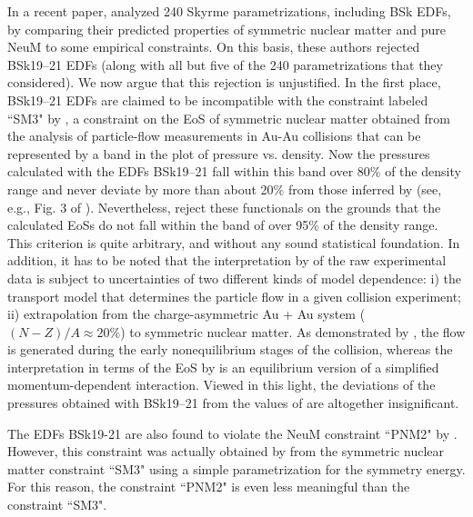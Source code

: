 \documentclass{aa}
\begin{document}
In a recent paper, \citet{dutra2012} analyzed 
240 Skyrme parametrizations, including
BSk EDFs, by comparing their predicted 
properties of symmetric nuclear matter and pure NeuM to some 
empirical constraints. On this basis, these authors rejected
BSk19--21 EDFs
(along with all but five of the 240 parametrizations that they considered). We
now argue that this rejection is unjustified. In the first 
place, BSk19--21 EDFs are claimed to be incompatible with the constraint
labeled ``SM3" by \citet{dutra2012}, a constraint on the EoS of symmetric nuclear
matter obtained from the analysis of particle-flow measurements in Au-Au
collisions \citep{danielewicz2002} that can be represented by a band in the
plot of pressure vs.{} density. Now the pressures calculated with the EDFs
BSk19--21 fall within this band over 80\% of the density range and never 
deviate by more than about 20\% from those inferred by 
\citet{danielewicz2002} (see, e.g., Fig. 3 of \citealt{Chamel-ea11}). Nevertheless,
\citet{dutra2012} reject these functionals on the grounds that the calculated EoSs
do not fall within the band of \citet{danielewicz2002} over 95\% of the density range. 
This criterion is quite arbitrary, and without any
sound statistical foundation. 
In addition, it has to be noted that the interpretation 
by \citet{danielewicz2002} of the raw experimental data is subject to
uncertainties of two different kinds of model dependence: i) the transport
model that determines the particle flow in a given collision experiment;
ii) extrapolation from the charge-asymmetric Au + Au system ($(N - Z)/A \approx
20\% $) to symmetric nuclear matter. 
As demonstrated by \citet{Gale-ea90}, the flow is generated
during the early nonequilibrium stages of the collision,
whereas the interpretation in terms of the EoS by 
\citet{danielewicz2002} is an equilibrium version of a
simplified momentum-dependent interaction.
Viewed in this light, the deviations of 
the pressures obtained with BSk19--21 from the values of
\citet{danielewicz2002} are altogether insignificant.

The EDFs BSk19-21 are also found to violate the NeuM constraint 
``PNM2" by \citet{dutra2012}. However, this
constraint was actually obtained by \citet{danielewicz2002} from the symmetric 
nuclear matter constraint ``SM3" using a simple parametrization for the 
symmetry energy. For this reason,
the constraint ``PNM2" is even less meaningful than the constraint ``SM3".
\end{document}
